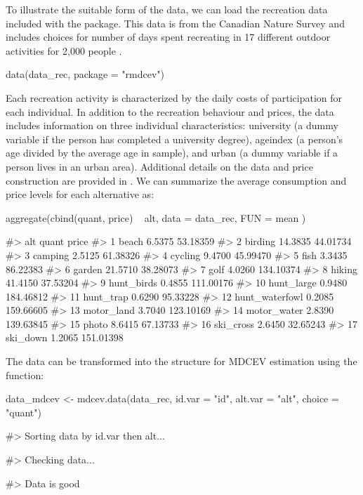To illustrate the suitable form of the data, we can load the recreation
data included with the  package. This data is from the
Canadian Nature Survey and includes choices for number of days spent
recreating in 17 different outdoor activities for 2,000 people
\citep{federal20122014}.

\begin{Schunk}
\begin{Sinput}
data(data_rec, package = "rmdcev")
\end{Sinput}
\end{Schunk}

Each recreation activity is characterized by the daily costs of
participation for each individual. In addition to the recreation
behaviour and prices, the data includes information on three individual
characteristics: university (a dummy variable if the person has
completed a university degree), ageindex (a person's age divided by the
average age in sample), and urban (a dummy variable if a person lives in
an urban area). Additional details on the data and price construction
are provided in \citet{lloydsmitheconomics2020}. We can summarize the
average consumption and price levels for each alternative as:

\begin{Schunk}
\begin{Sinput}
aggregate(cbind(quant, price) ~ alt, data = data_rec, FUN = mean )
\end{Sinput}
\begin{Soutput}
#>               alt   quant     price
#> 1           beach  6.5375  53.18359
#> 2         birding 14.3835  44.01734
#> 3         camping  2.5125  61.38326
#> 4         cycling  9.4700  45.99470
#> 5            fish  3.3435  86.22383
#> 6          garden 21.5710  38.28073
#> 7            golf  4.0260 134.10374
#> 8          hiking 41.4150  37.53204
#> 9      hunt_birds  0.4855 111.00176
#> 10     hunt_large  0.9480 184.46812
#> 11      hunt_trap  0.6290  95.33228
#> 12 hunt_waterfowl  0.2085 159.66605
#> 13     motor_land  3.7040 123.10169
#> 14    motor_water  2.8390 139.63845
#> 15          photo  8.6415  67.13733
#> 16      ski_cross  2.6450  32.65243
#> 17       ski_down  1.2065 151.01398
\end{Soutput}
\end{Schunk}

The data can be transformed into the structure for MDCEV estimation
using the  function:

\begin{Schunk}
\begin{Sinput}
data_mdcev <- mdcev.data(data_rec,
                       id.var = "id",
                       alt.var = "alt",
                       choice = "quant")
\end{Sinput}
\begin{Soutput}
#> Sorting data by id.var then alt...
\end{Soutput}
\begin{Soutput}
#> Checking data...
\end{Soutput}
\begin{Soutput}
#> Data is good
\end{Soutput}
\end{Schunk}


